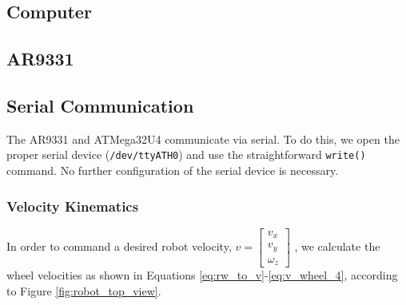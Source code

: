 \documentclass[letterpaper,12pt]{article}
\begin{document}
\subsection{Computer}
\subsection{AR9331}

\subsection{Serial Communication}
\label{sec:ar9331_serial_com}
\noindent The AR9331 and ATMega32U4 communicate via serial. To do this, we open the proper serial device (\texttt{/dev/ttyATH0}) and use the straightforward \texttt{write()} command. No further configuration of the serial device is necessary.


\subsubsection{Velocity Kinematics}
\label{sec:ar9331_vel_kin}

\noindent In order to command a desired robot velocity,
\begin{math}
  v=
  \begin{bmatrix}
    v_x \\
    v_y \\
    \omega_z
  \end{bmatrix}
\end{math}
, we calculate the wheel velocities as shown in Equations \ref{eq:rw_to_v}-\ref{eq:v_wheel_4}, according to Figure \ref{fig:robot_top_view}.
\end{document}
